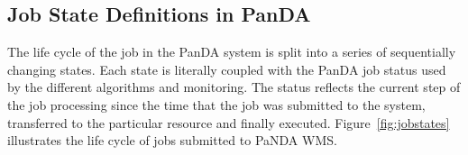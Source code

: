 




\subsection{Job State Definitions in PanDA}
\label{subsec:jobstatedefs}

The life cycle of the job in the PanDA system is split into a series of
sequentially changing states. Each state is literally coupled with the PanDA
job status used by the different algorithms and monitoring. The status reflects
the current step of the job processing since the time that the job was
submitted to the system, transferred to the particular resource and finally
executed. Figure~\ref{fig:jobstates} illustrates the life cycle of jobs
submitted to PaNDA WMS.

